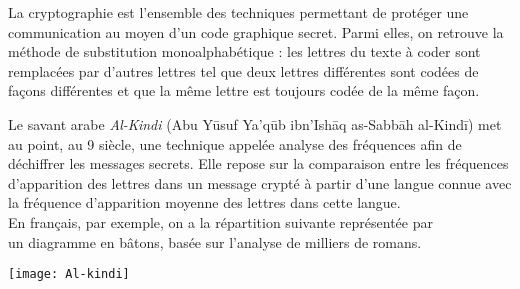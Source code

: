 \enigme[Cryptographie]
   La cryptographie est l'ensemble des techniques permettant de protéger une communication au moyen d'un code graphique secret. Parmi elles, on retrouve la méthode de substitution monoalphabétique : les lettres du texte à coder sont remplacées par d’autres lettres tel que  deux lettres différentes sont codées de façons différentes et que la même lettre est toujours codée de la même façon. \\
   \begin{minipage}{12cm}
      Le savant arabe {\it Al-Kindi}  (Abu Yūsuf Ya'qūb ibn'Ishāq as-Sabbāh al-Kindī) met au point, au 9 siècle, une technique appelée analyse des fréquences afin de déchiffrer les messages secrets. Elle repose sur la comparaison entre les fréquences d'apparition des lettres dans un message crypté à partir d'une langue connue avec la fréquence d'apparition moyenne des lettres dans cette langue. \\ [3mm]
      En français, par exemple, on a la répartition suivante représentée par \\
      un diagramme en bâtons, basée sur l'analyse de milliers de romans. 
   \end{minipage}
   \qquad
   \begin{minipage}{4cm}
      \texttt{[image: Al-kindi]}
   \end{minipage}
